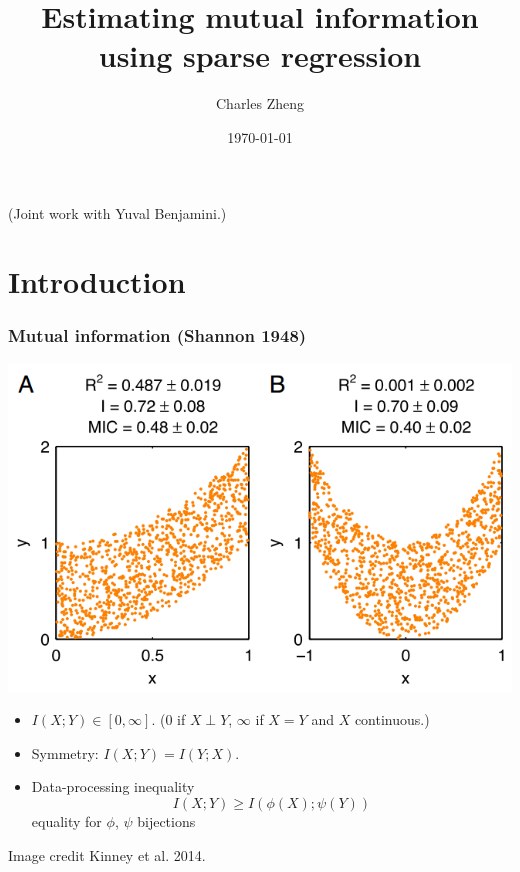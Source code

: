 \documentclass{beamer}
\title[Mutual information]{Estimating mutual information using sparse regression}
\author{Charles Zheng} %
\institute[Stanford] %
{Stanford University}
\date{\today} %
\begin{document}
\begin{frame}
\titlepage %
(Joint work with Yuval Benjamini.)
\end{frame}


\section{Introduction}

\begin{frame}
\frametitle{Mutual information (Shannon 1948)}
\begin{center}
\includegraphics[scale = 0.2]{kinney.png}
\end{center}
\begin{itemize}
\item $I(X;Y) \in [0,\infty]$.  (0 if $X \perp Y$, $\infty$ if $X=Y$ and $X$ continuous.)
\item Symmetry: $I(X;Y) = I(Y; X)$.
\item Data-processing inequality
\[I(X; Y) \geq I(\phi(X); \psi(Y))\]
equality for $\phi$, $\psi$ bijections
\end{itemize}
\tiny{Image credit Kinney et al. 2014.}
\end{frame}
\end{document}
